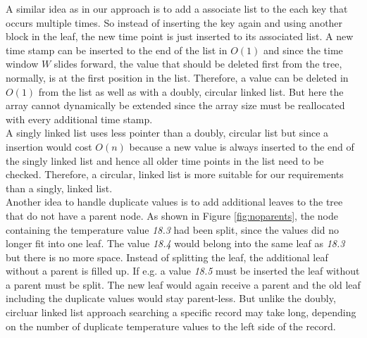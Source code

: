 \documentclass[abstracton,12pt]{scrreprt}
\begin{document}
A similar idea as in our approach is to add a associate list to the each key that occurs multiple times. So instead of inserting the key again and using another block in the leaf, the new time point is just inserted to its associated list. A new time stamp can be inserted to the end of the list in $O(1)$ and since the time window $W$ slides forward, the value that should be deleted first from the tree, normally, is at the first position in the list. Therefore, a value can be deleted in $O(1)$ from the list as well as with a doubly, circular linked list. But here the array cannot dynamically be extended since the array size must be reallocated with every additional time stamp. \\
A singly linked list uses less pointer than a doubly, circular list but since a insertion would cost $O(n)$ because a new value is always inserted to the end of the singly linked list and hence all older time points in the list need to be checked. Therefore, a circular, linked list is more suitable for our requirements than a singly, linked list. \\
Another idea to handle duplicate values is to add additional leaves to the tree that do not have a parent node. As shown in Figure \ref{fig:noparents}, the node containing the temperature value \emph{18.3} had been split, since the values did no longer fit into one leaf. The value \emph{18.4} would belong into the same leaf as \emph{18.3} but there is no more space. Instead of splitting the leaf, the additional leaf without a parent is filled up. If e.g. a value \emph{18.5} must be inserted the leaf without a parent must be split. The new leaf would again receive a parent and the old leaf including the duplicate values would stay parent-less. But unlike the doubly, circluar linked list approach searching a specific record may take long, depending on the number of duplicate temperature values to the left side of the record.
\end{document}
